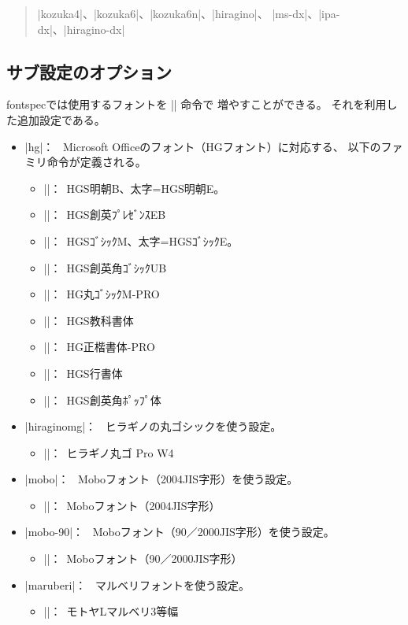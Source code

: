 \documentclass[xelatex,ja=standard,jafont=ipaex,
  a4paper]{bxjsarticle}
\newcommand{\Pkg}[1]{\textsf{#1}}
\newcommand{\Means}{：\ }
\newcommand{\JSl}{\mbox{／}\linebreak[0]}
\begin{document}
\begin{quote}
|kozuka4|、|kozuka6|、|kozuka6n|、|hiragino|、
|ms-dx|、|ipa-dx|、|hiragino-dx|
\end{quote}

\subsection{サブ設定のオプション}
\label{ssec:Sub-Option}

\Pkg{fontspec}では使用するフォントを |\newfontfamily| 命令で
増やすことができる。
それを利用した追加設定である。

\begin{itemize}
\item |hg|\Means
Microsoft Officeのフォント（HGフォント）に対応する、
以下のファミリ命令が定義される。
\begin{itemize}
\item |\hgmcfamily|\Means HGS明朝B、太字=HGS明朝E。
\item |\hgprfamily|\Means HGS創英ﾌﾟﾚｾﾞﾝｽEB
\item |\hggtfamily|\Means HGSｺﾞｼｯｸM、太字=HGSｺﾞｼｯｸE。
\item |\hggufamily|\Means HGS創英角ｺﾞｼｯｸUB
\item |\hgmgfamily|\Means HG丸ｺﾞｼｯｸM-PRO
\item |\hgkkfamily|\Means HGS教科書体
\item |\hgksfamily|\Means HG正楷書体-PRO
\item |\hggsfamily|\Means HGS行書体
\item |\hgppfamily|\Means HGS創英角ﾎﾟｯﾌﾟ体
\end{itemize}

\item |hiraginomg|\Means
ヒラギノの丸ゴシックを使う設定。
\begin{itemize}
\item |\hmgfamily|\Means ヒラギノ丸ゴ Pro W4
\end{itemize}

\item |mobo|\Means
Moboフォント（2004JIS字形）を使う設定。
\begin{itemize}
\item |\mobofamily|\Means Moboフォント（2004JIS字形）
\end{itemize}

\item |mobo-90|\Means
Moboフォント（90\JSl 2000JIS字形）を使う設定。
\begin{itemize}
\item |\mobofamily|\Means Moboフォント（90\JSl 2000JIS字形）
\end{itemize}

\item |maruberi|\Means
マルベリフォントを使う設定。
\begin{itemize}
\item |\mmgfamily|\Means モトヤLマルベリ3等幅
\end{itemize}
\end{itemize}
\end{document}
